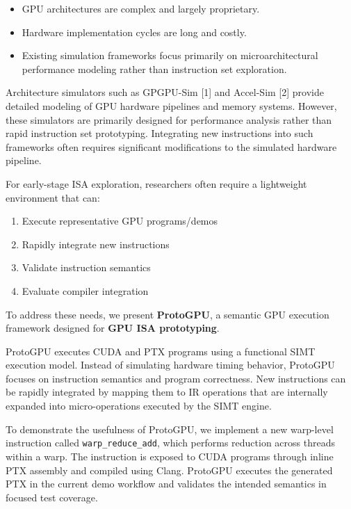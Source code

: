 \documentclass[11pt]{article}
\providecommand{\tightlist}{%
  \setlength{\itemsep}{0pt}\setlength{\parskip}{0pt}}
\begin{document}
\begin{itemize}
\tightlist
\item
  GPU architectures are complex and largely proprietary.
\item
  Hardware implementation cycles are long and costly.
\item
  Existing simulation frameworks focus primarily on microarchitectural
  performance modeling rather than instruction set exploration.
\end{itemize}

Architecture simulators such as GPGPU-Sim [1] and Accel-Sim [2]
provide detailed modeling of GPU hardware pipelines and memory systems.
However, these simulators are primarily designed for performance
analysis rather than rapid instruction set prototyping. Integrating new
instructions into such frameworks often requires significant
modifications to the simulated hardware pipeline.

For early-stage ISA exploration, researchers often require a lightweight
environment that can:

\begin{enumerate}
\def\labelenumi{\arabic{enumi}.}
\tightlist
\item
  Execute representative GPU programs/demos
\item
  Rapidly integrate new instructions
\item
  Validate instruction semantics
\item
  Evaluate compiler integration
\end{enumerate}

To address these needs, we present \textbf{ProtoGPU}, a semantic GPU
execution framework designed for \textbf{GPU ISA prototyping}.

ProtoGPU executes CUDA and PTX programs using a functional SIMT
execution model. Instead of simulating hardware timing behavior,
ProtoGPU focuses on instruction semantics and program correctness. New
instructions can be rapidly integrated by mapping them to IR operations
that are internally expanded into micro-operations executed by the SIMT
engine.

To demonstrate the usefulness of ProtoGPU, we implement a new warp-level
instruction called \texttt{warp\_reduce\_add}, which performs reduction
across threads within a warp. The instruction is exposed to CUDA
programs through inline PTX assembly and compiled using Clang. ProtoGPU
executes the generated PTX in the current demo workflow and validates
the intended semantics in focused test coverage.
\end{document}
